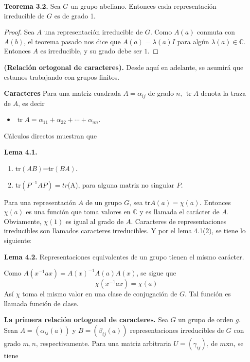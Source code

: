 \documentclass[12pt]{book}
\DeclareMathOperator{\tr}{tr}
\theoremstyle{definition}
\newcounter{in}
\newcounter{ini}
\begin{document}
\textbf{Teorema 3.2.} Sea $G$ un grupo abeliano. Entonces cada
representación irreducible de $G$ es de grado 1.

\begin{proof}
  Sea $A$ una representación irreducible de $G$. Como $A(a)$ conmuta
  con $A(b)$, el teorema pasado nos dice que $A(a)=\lambda(a) I$ para
  algún $\lambda(a) \in \mathbb{C}$. Entonces $A$ es irreducible, y su
  grado debe ser $1$.
\end{proof}

\textbf{(Relación ortogonal de caracteres).} Desde aquí en adelante,
se asumirá que estamos trabajando con grupos finitos.

\textbf{Caracteres} Para una matriz cuadrada $A=\alpha_{ij}$ de grado
$n$, $\tr A$ denota la traza de $A$, es decir
\begin{itemize}
  \item $\tr A= \alpha_{11}+ \alpha_{22} + \cdots + \alpha_{nn}$.
  \end{itemize}

Cálculos directos muestran que

\textbf{Lema 4.1. }
\begin{enumerate}
\item tr$(AB)$=tr$(BA)$.
\item tr$(P^{-1}AP)=tr$(A), para alguna matriz no singular $P$.
\end{enumerate}

Para una representación $A$ de un grupo $G$, sea
tr$A(a)=\chi(a)$. Entonces $\chi(a)$ es una función que toma valores
en $\mathbb{C}$ y es llamada el carácter de $A$. Obviamente, $\chi(1)$
es igual al grado de $A$. Caracteres de representaciones irreducibles
son llamados caracteres irreducibles. Y por el lema 4.1(2), se tiene
lo siguiente:

\textbf{Lema 4.2. } Representaciones equivalentes de un grupo tienen
el mismo carácter.

Como $A(x^{-1}ax)=A(x)^{-1}A(a)A(x)$, se sigue que
\begin{equation*}
  \chi(x^{-1}ax)=\chi(a)
\end{equation*}  
Así $\chi$ toma el mismo valor en una clase de conjugación de $G$. Tal
función es llamada función de clase.

\textbf{La primera relación ortogonal de caracteres.} Sea $G$ un grupo
de orden $g$. Sean $A=(\alpha_{ij}(a))$ y $B=(\beta_{ij}(a))$ representaciones irreducibles de $G$ con grado $m,n$,
respectivamente. Para una matriz arbitraria $U=(\gamma_{ij})$, de
$m$x$n$, se tiene
\end{document}
